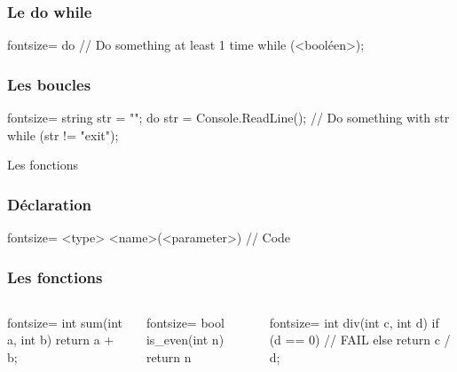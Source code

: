\begin{frame}[fragile]
  \frametitle{Le do while}

  \begin{csharpcode*}{fontsize=\scriptsize}
    do
    {
      // Do something at least 1 time
    } while (<booléen>);
  \end{csharpcode*}
\end{frame}

\begin{frame}[fragile]
  \frametitle{Les boucles}

  \begin{csharpcode*}{fontsize=\scriptsize}
    string str = "";
    do
    {
      str = Console.ReadLine();
      // Do something with str
    } while (str != "exit");
  \end{csharpcode*}
\end{frame}

\begin{frame}
  \begin{center}
    \vspace{1cm}
    Les fonctions
  \end{center}
\end{frame}

\begin{frame}[fragile]
  \frametitle{Déclaration}

  \begin{csharpcode*}{fontsize=\scriptsize}
    <type> <name>(<parameter>)
    {
      // Code
    }
  \end{csharpcode*}
\end{frame}

\begin{frame}[fragile]
  \frametitle{Les fonctions}

  \begin{columns}[c]
    \column{2.2in}
    \begin{csharpcode*}{fontsize=\scriptsize}
      int sum(int a, int b)
      {
        return a + b;
      }
    \end{csharpcode*}

    \pause

    \begin{csharpcode*}{fontsize=\scriptsize}
      bool is_even(int n)
      {
        return n %
      }
    \end{csharpcode*}

    \pause

    \column{2.3in}
    \begin{csharpcode*}{fontsize=\scriptsize}
      int div(int c, int d)
      {
        if (d == 0)
        {
          // FAIL
        }
        else
          return c / d;
      }
    \end{csharpcode*}
  \end{columns}
\end{frame}

